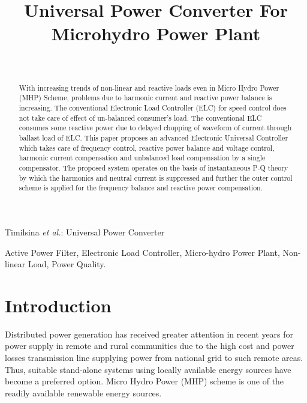 \documentclass[journal,twoside]{IEEEtran}
\begin{document}
    \setcounter{page}{48}
    \title{Universal Power Converter For
Microhydro Power Plant}
    \author{\\
    }

%
{Timilsina \MakeLowercase{\textit{et al.}}: Universal Power Converter}
    \maketitle
	\begin{abstract}
With increasing trends of non-linear and reactive
loads even in Micro Hydro Power (MHP) Scheme, problems due
to harmonic current and reactive power balance is increasing.
The conventional Electronic Load Controller (ELC) for speed
control does not take care of effect of un-balanced consumer’s
load. The conventional ELC consumes some reactive power due
to delayed chopping of waveform of current through ballast load
of ELC. This paper proposes an advanced Electronic Universal
Controller which takes care of frequency control, reactive power
balance and voltage control, harmonic current compensation and
unbalanced load compensation by a single compensator. The
proposed system operates on the basis of instantaneous P-Q
theory by which the harmonics and neutral current is suppressed
and further the outer control scheme is applied for the frequency
balance and reactive power compensation.
	\end{abstract}
	\begin{IEEEkeywords}
Active Power Filter, Electronic Load Controller, Micro-hydro Power Plant, Non-linear Load, 
Power Quality.
	\end{IEEEkeywords}
	\section{Introduction}
Distributed power generation has received greater attention
in recent years for power supply in remote and rural
communities due to the high cost and power losses
transmission line supplying power from national grid to such
remote areas. Thus, suitable stand-alone systems using locally
available energy sources have become a preferred option.
Micro Hydro Power (MHP) scheme is one of the readily
available renewable energy sources\cite{1}.
\end{document}
